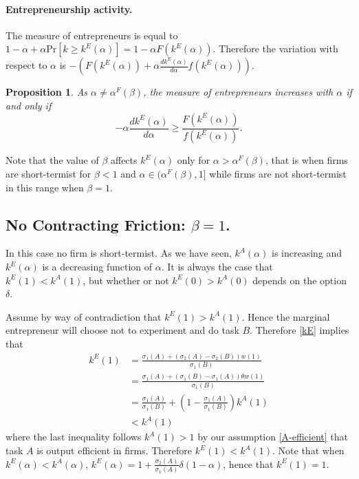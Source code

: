 \documentclass[12pt]{article}
\newtheorem{proposition}{Proposition} \theoremstyle{definition}
\begin{document}
\paragraph{Entrepreneurship activity.} The measure of entrepreneurs is equal to $1-\alpha+\alpha \text{Pr}[k\geq k^E(\alpha)]=1-\alpha F(k^E(\alpha))$. Therefore the variation with respect to $\alpha$ is $-(F(k^E(\alpha))+\alpha \frac{dk^E(\alpha)}{d\alpha}f(k^E(\alpha)))$. 

\begin{proposition}\label{prop:change-ent}
    As $\alpha\neq \alpha^F(\beta)$, the measure of entrepreneurs increases with $\alpha$ if and only if
    \begin{equation*}
      -\alpha \frac{dk^E(\alpha)}{d\alpha}\geq \frac{F(k^E(\alpha))}{f(k^E(\alpha))}.
    \end{equation*}
\end{proposition}
%
Note that the value of $\beta$ affects $k^E(\alpha)$ only for $\alpha>\alpha^F(\beta)$, that is when firms are short-termist for $\beta<1$ and $\alpha\in(\alpha^F(\beta),1]$ while firms are not short-termist in this range when $\beta=1$.



\subsection{No Contracting Friction: $\beta=1$.} In this case no firm is short-termist. As we have seen, $k^A(\alpha)$ is increasing and $k^E(\alpha)$ is a decreasing function of $\alpha$. It is always the case that $k^E(1)<k^A(1)$, but whether or not $k^E(0)>k^A(0)$ depends on the option $\delta$.

Assume by way of contradiction that  $k^E(1)> k^A(1)$. Hence the marginal entrepreneur will choose not to experiment and do task $B$. Therefore \eqref{kE} implies that 
%
\begin{align*}
    k^E(1)&=\frac{\sigma_1(A)+(\sigma_2(A)-\sigma_2(B))w(1)}{\sigma_1(B)}\\ 
    &= \frac{\sigma_1(A)+(\sigma_1(B)-\sigma_1(A))\theta  w(1)}{\sigma_1(B)}\\ 
    &=\frac{\sigma_1(A)}{\sigma_1(B)}+\left(1-\frac{\sigma_1(A)}{\sigma_1(B)}\right)k^A(1)\\ 
    &<k^A(1)
\end{align*}
where the last inequality follows $k^A(1)>1$ by our assumption \ref{A-efficient} that task $A$ is output efficient in firms. Therefore $k^E(1)<k^A(1)$. Note that when $k^E(\alpha)<k^A(\alpha)$, $k^E(\alpha)=1+\frac{\sigma_2(A)}{\sigma_1(A)}\delta(1-\alpha)$, hence that $k^E(1)=1$.
\end{document}
